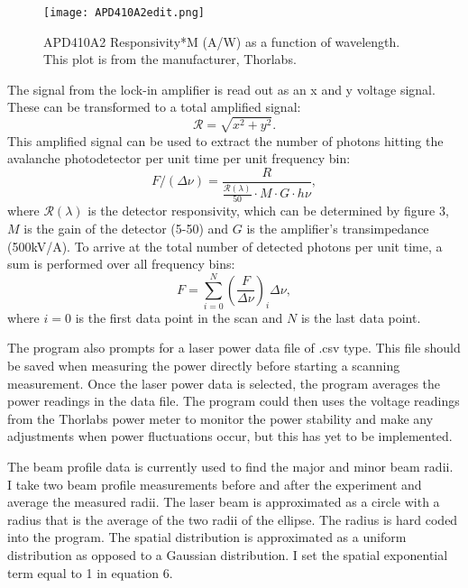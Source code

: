\documentclass[12pt, a4paper]{article}
\begin{document}
\begin{figure}
  \vspace*{-8mm}
  \texttt{[image: APD410A2edit.png]}
  \vspace*{-6mm}
  \caption{APD410A2 Responsivity*M (A/W) as a function of wavelength. This plot is from the manufacturer, Thorlabs.}
\end{figure}


The signal from the lock-in amplifier is read out as an x and y voltage signal. These can be transformed to a total amplified signal:
\begin{equation}
\mathscr{R} = \sqrt{x^2+y^2}.
\end{equation}
This amplified signal can be used to extract the number of photons hitting the avalanche photodetector per unit time per unit frequency bin:
\begin{equation}
F/(\Delta \nu) = \frac{R}{\frac{\mathcal{R}(\lambda)}{50}\cdot M\cdot G \cdot h\nu},
\end{equation}
where $\mathcal{R}(\lambda)$ is the detector responsivity, which can be determined by figure 3, $M$ is the gain of the detector (5-50) and $G$ is the amplifier's transimpedance (500kV/A). To arrive at the total number of detected photons per unit time, a sum is performed over all frequency bins:
\begin{equation}
F = \sum_{i=0}^{N}(\frac{F}{\Delta \nu})_i \Delta \nu,
\end{equation}
where $i=0$ is the first data point in the scan and $N$ is the last data point.

The program also prompts for a laser power data file of .csv type. This file should be saved when measuring the power directly before starting a scanning measurement. Once the laser power data is selected, the program averages the power readings in the data file. The program could then uses the voltage readings from the Thorlabs power meter to monitor the power stability and make any adjustments when power fluctuations occur, but this has yet to be implemented. 

The beam profile data is currently used to find the major and minor beam radii. I take two beam profile measurements before and after the experiment and average the measured radii.  The laser beam is approximated as a circle with a radius that is the average of the two radii of the ellipse. The radius is hard coded into the program. The spatial distribution is approximated as a uniform distribution as opposed to a Gaussian distribution. I set the spatial exponential term equal to 1 in equation 6. 
\end{document}

